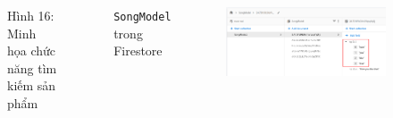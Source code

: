 \documentclass{beamer}
\begin{document}
\begin{frame}
\begin{columns}
\begin{figure}
            \caption{\centering\tiny{Hình 16: Minh họa chức năng tìm kiếm sản phẩm}}
        \end{figure}
        \indent \texttt{SongModel} trong Firestore
        \begin{figure}
            \centering
            \includegraphics[width=\textwidth]{images/47.png}
        \end{figure}
    \end{columns}
\end{frame}
\end{document}
